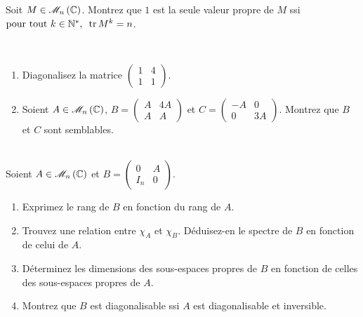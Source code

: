 \begin{exo}
Soit \(M\in\M{n}[\C]\). Montrez que \(1\) est la seule valeur propre de \(M\) ssi \(\quantifs{\tpt k\in\Ns}\tr M^k=n\).
\end{exo}



\begin{exo}~\\
\begin{enumerate}
    \item Diagonalisez la matrice \(\begin{pmatrix}
        1 & 4 \\
        1 & 1
    \end{pmatrix}\). \\
    \item Soient \(A\in\M{n}[\C]\), \(B=\begin{pmatrix}
        A & 4A \\
        A & A
    \end{pmatrix}\) et \(C=\begin{pmatrix}
        -A & 0 \\
        0 & 3A
    \end{pmatrix}\). Montrez que \(B\) et \(C\) sont semblables.
\end{enumerate}
\end{exo}



\begin{exo}~\\
Soient \(A\in\M{n}[\C]\) et \(B=\begin{pmatrix}
0 & A \\
I_n & 0
\end{pmatrix}\).

\begin{enumerate}
    \item Exprimez le rang de \(B\) en fonction du rang de \(A\). \\
    \item Trouvez une relation entre \(\chi_A\) et \(\chi_B\). Déduisez-en le spectre de \(B\) en fonction de celui de \(A\). \\
    \item Déterminez les dimensions des sous-espaces propres de \(B\) en fonction de celles des sous-espaces propres de \(A\). \\
    \item Montrez que \(B\) est diagonalisable ssi \(A\) est diagonalisable et inversible.
\end{enumerate}
\end{exo}



